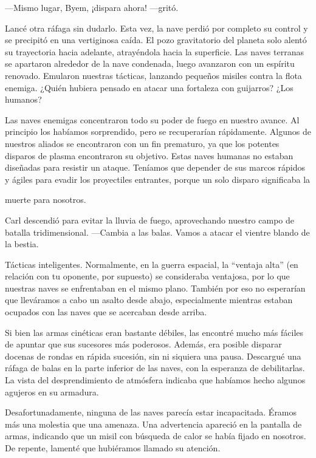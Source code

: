 \documentclass[spanish,12pt,a4paper,oneside,titlepage]{book}
\begin{document}
    —Mismo lugar, Byem, ¡dispara ahora! —gritó.

    Lancé otra ráfaga sin dudarlo. Esta vez, la nave perdió por completo su control y se precipitó en una vertiginosa caída. El pozo gravitatorio del planeta solo alentó su trayectoria hacia adelante, atrayéndola hacia la superficie. Las naves terranas se apartaron alrededor de la nave condenada, luego avanzaron con un espíritu renovado. Emularon nuestras tácticas, lanzando pequeños misiles contra la flota enemiga. ¿Quién hubiera pensado en atacar una fortaleza con guijarros? ¿Los humanos?

    Las naves enemigas concentraron todo su poder de fuego en nuestro avance. Al principio los habíamos sorprendido, pero se recuperarían rápidamente. Algunos de nuestros aliados se encontraron con un fin prematuro, ya que los potentes disparos de plasma encontraron su objetivo. Estas naves humanas no estaban diseñadas para resistir un ataque. Teníamos que depender de sus marcos rápidos y ágiles para evadir los proyectiles entrantes, porque un solo disparo significaba la

    muerte para nosotros.

    Carl descendió para evitar la lluvia de fuego, aprovechando nuestro campo de batalla tridimensional. —Cambia a las balas. Vamos a atacar el vientre blando de la bestia.

    Tácticas inteligentes. Normalmente, en la guerra espacial, la ``ventaja alta'' (en relación con tu oponente, por supuesto) se consideraba ventajosa, por lo que nuestras naves se enfrentaban en el mismo plano. También por eso no esperarían que lleváramos a cabo un asalto desde abajo, especialmente mientras estaban ocupados con las naves que se acercaban desde arriba.

    Si bien las armas cinéticas eran bastante débiles, las encontré mucho más fáciles de apuntar que sus sucesores más poderosos. Además, era posible disparar docenas de rondas en rápida sucesión, sin ni siquiera una pausa. Descargué una ráfaga de balas en la parte inferior de las naves, con la esperanza de debilitarlas. La vista del desprendimiento de atmósfera indicaba que habíamos hecho algunos agujeros en su armadura.

    Desafortunadamente, ninguna de las naves parecía estar incapacitada. Éramos más una molestia que una amenaza. Una advertencia apareció en la pantalla de armas, indicando que un misil con búsqueda de calor se había fijado en nosotros. De repente, lamenté que hubiéramos llamado su atención.
\end{document}
